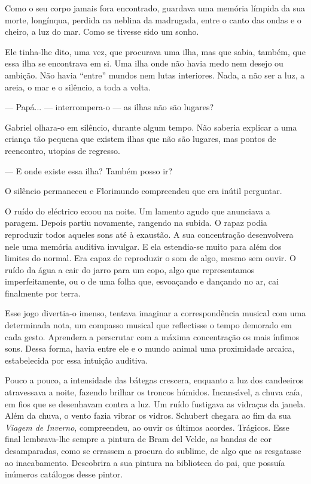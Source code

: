 Como o seu corpo jamais fora encontrado, guardava uma memória límpida da
sua morte, longínqua, perdida na neblina da madrugada, entre o canto das
ondas e o cheiro, a luz do mar. Como se tivesse sido um sonho.

Ele tinha-lhe dito, uma vez, que procurava uma ilha, mas que sabia,
também, que essa ilha se encontrava em si. Uma ilha onde não havia medo
nem desejo ou ambição. Não havia ``entre'' mundos nem lutas interiores.
Nada, a não ser a luz, a areia, o mar e o silêncio, a toda a volta.

--- Papá... --- interrompera-o --- as ilhas não são lugares?

Gabriel olhara-o em silêncio, durante algum tempo. Não saberia explicar
a uma criança tão pequena que existem ilhas que não são lugares, mas
pontos de reencontro, utopias de regresso.

--- E onde existe essa ilha? Também posso ir?

O silêncio permaneceu e Florimundo compreendeu que era inútil perguntar.

O ruído do eléctrico ecoou na noite. Um lamento agudo que anunciava a
paragem. Depois partiu novamente, rangendo na subida. O rapaz podia
reproduzir todos aqueles sons até à exaustão. A sua concentração
desenvolvera nele uma memória auditiva invulgar. E ela estendia-se muito
para além dos limites do normal. Era capaz de reproduzir o som de algo,
mesmo sem ouvir. O ruído da água a cair do jarro para um copo, algo que
representamos imperfeitamente, ou o de uma folha que, esvoaçando e
dançando no ar, cai finalmente por terra.

Esse jogo divertia-o imenso, tentava imaginar a correspondência musical
com uma determinada nota, um compasso musical que reflectisse o tempo
demorado em cada gesto. Aprendera a perscrutar com a máxima concentração
os mais ínfimos sons. Dessa forma, havia entre ele e o mundo animal uma
proximidade arcaica, estabelecida por essa intuição auditiva.

Pouco a pouco, a intensidade das bátegas crescera, enquanto a luz dos
candeeiros atravessava a noite, fazendo brilhar os troncos húmidos.
Incansável, a chuva caía, em fios que se desenhavam contra a luz. Um
ruído fustigava as vidraças da janela. Além da chuva, o vento fazia
vibrar os vidros. Schubert chegara ao fim da sua \emph{Viagem de
Inverno}, compreendeu, ao ouvir os últimos acordes. Trágicos. Esse final
lembrava-lhe sempre a pintura de Bram del Velde, as bandas de cor
desamparadas, como se errassem a procura do sublime, de algo que as
resgatasse ao inacabamento. Descobrira a sua pintura na biblioteca do
pai, que possuía inúmeros catálogos desse pintor.

